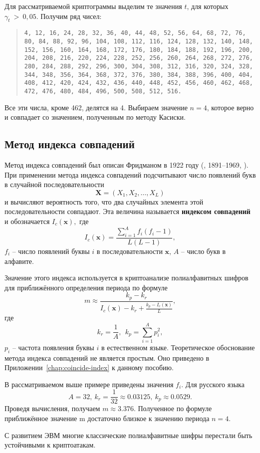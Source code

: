 \example
Для рассматриваемой криптограммы выделим те значения $t$, для которых $\gamma _t~>~0,05.$ Получим ряд чисел:

\begin{quote}
    \noindent \texttt{4, 12, 16, 24, 28, 32, 36, 40, 44, 48, 52, 56, 64, 68, 72, 76, 80, 84, 88, 92, 96, 104, 108, 112, 116, 124, 128, 132, 140, 148, 152, 156, 160, 164, 168, 172, 176, 180, 184, 188, 192, 196, 200, 204, 208, 216, 220, 224, 228, 252, 256, 260, 264, 268, 272, 276, 280, 284, 288, 292, 296, 300, 304, 308, 312, 316, 320, 324, 328, 344, 348, 356, 364, 368, 372, 376, 380, 384, 388, 396, 400, 404, 408, 412, 420, 424, 432, 436, 440, 448, 452, 456, 460, 462, 468, 472, 476, 480, 484, 496, 500, 508, 512, 516.}
\end{quote}

Все эти числа, кроме 462, делятся на 4. Выбираем значение $n=4$, которое верно и совпадает со значением, полученным по методу Касиски.
\exampleend


\subsection{Метод индекса совпадений}

Метод индекса совпадений был описан Фридманом в 1922 году (, 1891--1969, \cite{Friedman:1922}). При применении метода индекса совпадений подсчитывают число появлений букв в случайной последовательности
    \[ \mathbf{X} = (X_1 ,X_2 , \ldots , X_L ) \]
и вычисляют вероятность того, что два случайных элемента этой последовательности совпадают. Эта величина называется \textbf{индексом совпадений} и обозначается $I_{c}(\mathbf{x}),$ где
    \[ I_{c} (\mathbf{x}) = \frac{{\sum\limits_{i = 1}^A {f_i (f_i  - 1)} }} {{L(L - 1)}}, \]
$f_{i}$ -- число появлений буквы $i$ в последовательности $\mathbf{x}$, $A$ -- число букв в алфавите.

Значение этого индекса используется в криптоанализе полиалфавитных шифров для приближённого определения периода по формуле
    \[ m \approx \frac{{k_p  - k_r }} {{I_{c} (\mathbf{x}) - k_r  + \frac{{k_p  - I_{c} (\mathbf{x})}} {L}}}, \]
где
    \[ k_r  = \frac{1}{A}, ~~ k_p  = \sum\limits_{i=1}^A p_i^2, \]
$p_i $ -- частота появления буквы $i$ в естественном языке.
Теоретическое обоснование метода индекса совпадений не является простым. Оно приведено в Приложении~\ref{chap:coincide-index} к данному пособию.

\example
В рассматриваемом выше примере приведены значения $f_{i}$. Для русского языка
    \[ A=32, ~ k_{r} = \frac{1}{32} \approx 0.03125, ~ k_{p} \approx 0.0529. \]
Проведя вычисления, получаем $m \approx 3.376$. Полученное по формуле приближённое значение m достаточно близкое к значению периода $n=4$.
\exampleend

С развитием ЭВМ многие классические полиалфавитные шифры перестали быть устойчивыми к криптоатакам.
